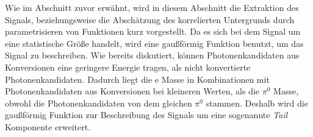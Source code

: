 Wie im Abschnitt zuvor erw\"ahnt, wird in diesem Abschnitt die Extraktion des Signals, beziehungsweise die Absch\"atzung des korrelierten Untergrunds durch parametrisieren von Funktionen kurz vorgestellt.
\newline
Da es sich bei dem Signal um eine statistische Gr\"o{\ss}e handelt, wird eine gau{\ss}f\"ormig Funktion benutzt, um das Signal zu beschreiben.
\newline
Wie bereits diskutiert, k\"onnen Photonenkandidaten aus Konversionen eine geringere Energie tragen, als nicht konvertierte Photonenkandidaten.
Dadurch liegt die                                                                                                                                                                                                                                                                                                                                                                                                                                                                                                                                                                                                                                                                                                                                                                                                                                                                                                                                                                                                                                                                                                                                                                                                                                                                                                                                                                                                                                                                                                                                                                                                       e Masse in Kombinationen mit Photonenkandidaten aus Konversionen bei kleineren Werten, als die $\pi^{0}$ Masse, obwohl die Photonenkandidaten von dem gleichen $\pi^{0}$ stammen.
Deshalb wird die gau{\ss}f\"ormig Funktion zur Beschreibung des Signals um eine sogenannte \textit{Tail} Komponente erweitert.
